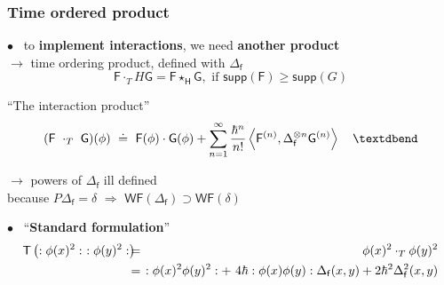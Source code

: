 \documentclass[9pt]{beamer}
\newcommand{\sm}[1]{\left\langle #1 \right\rangle}
\newcommand{\WF}{\mathsf{WF}}
\newcommand{\supp}{\mathsf{supp}}
\newcommand{\Fsf}{\mathsf{F}}
\newcommand{\Gsf}{\mathsf{G}}
\newcommand{\Hsf}{\mathsf{H}}
\newcommand{\Tsf}{\mathsf{T}}
\newcommand{\fsf}{\mathsf{f}}
\begin{document}
\begin{frame}

\frametitle{Time ordered product}

\vfill

$\bullet$ \ to \textbf{implement interactions}, we need \textbf{another product} \\
\hspace*{8pt} $\to$ time ordering product, defined with $\Delta_\fsf$ 
\vspace*{-8pt}
\begin{equation*}
\Fsf \cdot_TH \Gsf = \Fsf \star_\Hsf \Gsf, \mbox{ if } \supp(\Fsf) \geq \supp(G)
\end{equation*}

\begin{block}{``The interaction product''}
\vspace*{-13pt}
\begin{equation*}
(\Fsf \ \cdot_T \ \Gsf)(\phi) \ \doteq \ \Fsf(\phi) \cdot \Gsf(\phi) + \sum_{n=1}^{\infty} \frac{\hbar^n}{n!} \sm{\Fsf^{(n)},\Delta_{\fsf}^{\otimes n} \Gsf^{(n)}} \quad \textdbend  
\vspace*{-6pt}
\end{equation*}
\end{block}

\hspace*{8pt} $\to$ powers of $\Delta_\fsf$ ill defined \\
\hspace*{20pt} because $P \Delta_\fsf = \delta$ $\Rightarrow$ $\WF(\Delta_\fsf) \supset \WF(\delta)$ \\

\vfill

$\bullet$ \ ``\textbf{Standard formulation}'' \\[-20pt]
%
\begin{eqnarray*}
\Tsf \left( :\phi(x)^2: \ :\phi(y)^2: \right) \hspace*{-6pt} &=& \hspace*{-6pt} \phi(x)^2 \cdot_T \phi(y)^2 \\ 
&=& \hspace*{-6pt} :\phi(x)^2 \phi(y)^2: + \ 4 \hbar :\phi(x) \phi(y): \Delta_\fsf(x,y) + 2 \hbar^2 \Delta^2_\fsf(x,y)
\end{eqnarray*}

\vfill

\end{frame}  
\end{document}
